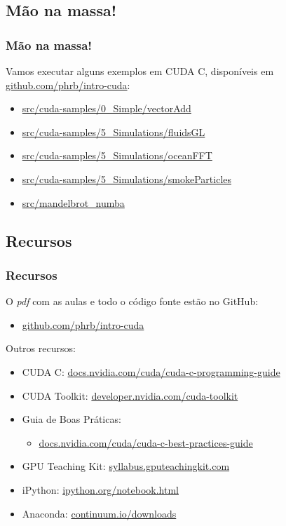 \documentclass[10pt, compress]{beamer}
\begin{document}
\subsection{Mão na massa!}

\begin{frame}
    \frametitle{Mão na massa!}
    Vamos executar alguns exemplos em CUDA C,
    disponíveis em \url{github.com/phrb/intro-cuda}:
    \begin{itemize}
        \item \url{src/cuda-samples/0_Simple/vectorAdd}
        \item \url{src/cuda-samples/5_Simulations/fluidsGL}
        \item \url{src/cuda-samples/5_Simulations/oceanFFT}
        \item \url{src/cuda-samples/5_Simulations/smokeParticles}
        \item \url{src/mandelbrot_numba}
    \end{itemize}
\end{frame}

\subsection{Recursos}

\begin{frame}
    \frametitle{Recursos}
    O \emph{pdf} com as aulas e todo o código fonte estão no \alert{GitHub}:

    \begin{itemize}
        \item \url{github.com/phrb/intro-cuda}
    \end{itemize}

    Outros recursos:

    \begin{itemize}
        \item CUDA C: \url{docs.nvidia.com/cuda/cuda-c-programming-guide}
        \item CUDA Toolkit: \url{developer.nvidia.com/cuda-toolkit}
        \item Guia de Boas Práticas:
            \begin{itemize}
                \item \url{docs.nvidia.com/cuda/cuda-c-best-practices-guide}
            \end{itemize}
        \item GPU Teaching Kit: \url{syllabus.gputeachingkit.com}
        \item iPython: \url{ipython.org/notebook.html}
        \item Anaconda: \url{continuum.io/downloads}
    \end{itemize}
\end{frame}
\end{document}
